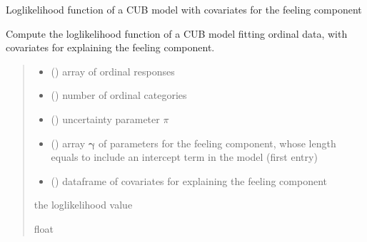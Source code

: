 \documentclass[letterpaper,10pt,english]{sphinxmanual}
\begin{document}
\begin{fulllineitems}
\label{\detokenize{cubmods:cubmods.cub_0w.loglik}}
\pysigstartsignatures
{}
\pysigstopsignatures
\sphinxAtStartPar
Log\sphinxhyphen{}likelihood function of a CUB model with covariates for the feeling component

\sphinxAtStartPar
Compute the log\sphinxhyphen{}likelihood function of a CUB model fitting ordinal data, with
covariates for explaining the feeling component.
\begin{quote}\begin{description}
\begin{itemize}
\item {} 
\sphinxAtStartPar
{} () \textendash{} array of ordinal responses

\item {} 
\sphinxAtStartPar
{} () \textendash{} number of ordinal categories

\item {} 
\sphinxAtStartPar
{} () \textendash{} uncertainty parameter \(\pi\)

\item {} 
\sphinxAtStartPar
{} () \textendash{} array \(\pmb \gamma\) of parameters for the feeling component, whose length equals 
 to include an intercept term in the model (first entry)

\item {} 
\sphinxAtStartPar
{} () \textendash{} dataframe of covariates for explaining the feeling component

\end{itemize}

\sphinxAtStartPar
the log\sphinxhyphen{}likelihood value

\sphinxAtStartPar
float

\end{description}\end{quote}

\end{fulllineitems}
\end{document}
